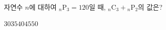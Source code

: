 \hspace*{2mm}\begin{minipage}[t]{\dimexpr\linewidth-2mm\relax}\vspace{0pt}
자연수 $n$에 대하여 ${}_n\mathrm{P}_3=120$일 때, ${}_n\mathrm{C}_3+{}_n\mathrm{P}_2$의 값은?
\begin{choices32}{$30$}{$35$}{$40$}{$45$}{$50$}\end{choices32}\end{minipage}
